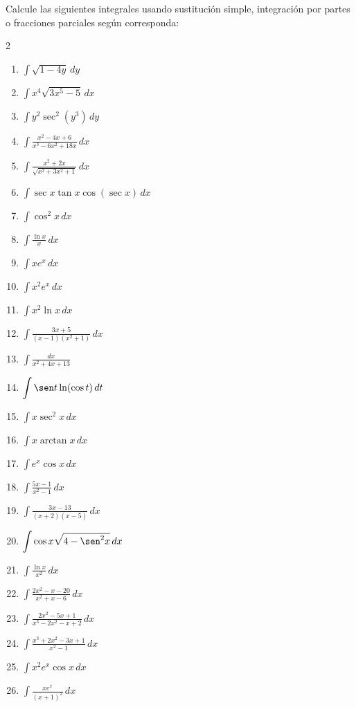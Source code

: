 \begin{prob}
Calcule las siguientes integrales usando sustitución simple, integración
por partes o fracciones parciales según corresponda:
\begin{multicols}{2}
\begin{enumerate}
\item $\displaystyle\int\sqrt{1-4y}\,dy$
\item $\displaystyle\int x^4\sqrt{3x^5-5}\,dx$
\item $\displaystyle\int y^2\sec^2(y^3)\,dy$
\item $\displaystyle\int\frac{x^2-4x+6}{x^3-6x^2+18x}\,dx$
\item $\displaystyle\int\frac{x^2+2x}{\sqrt{x^3+3x^2+1}}\,dx$
\item $\displaystyle\int\sec x\tan x\cos(\sec x)\,dx$
\item $\displaystyle\int\cos^2 x\,dx$
\item $\displaystyle\int\frac{\ln x}{x}\,dx$
\item $\displaystyle\int x e^{x}\,dx$
\item $\displaystyle\int x^2 e^x\,dx$
\item $\displaystyle\int x^2\ln x\,dx$
\item $\displaystyle\int\frac{3x+5}{(x-1)(x^2+1)}\,dx$
\item $\displaystyle\int\frac{dx}{x^2+4x+13}$
\item $\displaystyle\int\sen t\ln(\cos t)\,dt$
\item $\displaystyle\int x\sec^2 x\,dx$
\item $\displaystyle\int x\arctan x\,dx$
\item $\displaystyle\int e^x\cos x\,dx$
\item $\displaystyle\int\frac{5x-1}{x^2-1}\,dx$
\item $\displaystyle\int\frac{3x-13}{(x+2)(x-5)}\,dx$
\item $\displaystyle\int\cos x\sqrt{4-\sen^2 x}\,dx$
\item $\displaystyle\int\frac{\ln x}{x^2}\,dx$
\item $\displaystyle\int\frac{2x^2-x-20}{x^2+x-6}\,dx$
\item $\displaystyle\int\frac{2x^2-5x+1}{x^3-2x^2-x+2}\,dx$
\item $\displaystyle\int\frac{x^3+2x^2-3x+1}{x^2-1}\,dx$
\item $\displaystyle\int x^2 e^x\cos x\,dx$
\item $\displaystyle\int\frac{xe^x}{(x+1)^2}\,dx$

\end{enumerate}
\end{multicols}
\end{prob}
